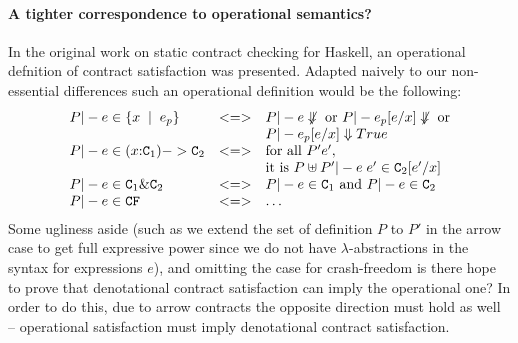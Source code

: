 

\paragraph{A tighter correspondence to operational semantics?}

In the original work on static contract checking for Haskell, an operational defnition
of contract satisfaction was presented. Adapted naively to our non-essential differences
such an operational definition would be the following: 
{\setlength{\arraycolsep}{2pt}
\[\begin{array}{lcl}
    P |- e \in \{ x\;\mid\;e_p\} & <=> & P |- e \not\Downarrow \mbox{ or } P |- e_p[e/x] \not\Downarrow \mbox{ or} \\ 
                                 &     & P |- e_p[e/x] \Downarrow True \\
    P |- e \in (x{:}{\tt C}_1) -> {\tt C}_2 & <=> & 
                                 \mbox{for all } P' e', \\ 
                                   &   &  \mbox{it is } P\uplus P' |- e\;e' \in {\tt C}_2[e'/x] \\
    P |- e \in {\tt C}_1 \& {\tt C}_2 & <=> & P |- e \in {\tt C}_1 \mbox{ and } P |- e \in {\tt C}_2 \\
    P |- e \in {\tt CF}            & <=> & \ldots 
\end{array}\]}
Some ugliness aside (such as we extend the set of definition $P$ to $P'$ in the arrow case to get full expressive 
power since we do not have $\lambda$-abstractions in the syntax for expressions $e$), and omitting the case for crash-freedom
is there hope to prove that denotational contract satisfaction can imply the operational one? In order to do this, due to 
arrow contracts the opposite direction must hold as well -- operational satisfaction must imply denotational contract 
satisfaction. 



